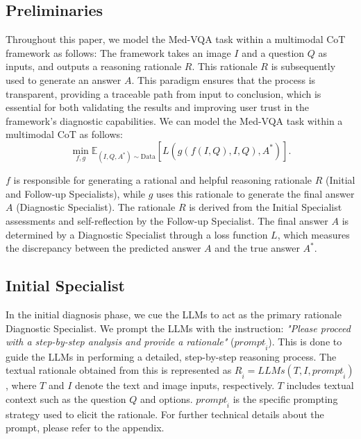 \documentclass[11pt]{article}
\begin{document}
\subsection{Preliminaries}
Throughout this paper, we model the Med-VQA task within a multimodal CoT framework as follows: The framework takes an image \( I \) and a question \( Q \) as inputs, and outputs a reasoning rationale \( R \). This rationale \( R \) is subsequently used to generate an answer \( A \). This paradigm ensures that the process is transparent, providing a traceable path from input to conclusion, which is essential for both validating the results and improving user trust in the framework's diagnostic capabilities. We can model the Med-VQA task within a multimodal CoT as follows:
\begin{equation}
    \min_{f, g} \mathbb{E}_{(I, Q, A^*) \sim \text{Data}} \left[ L \left( g \left( f(I, Q), I, Q \right), A^* \right) \right].
\end{equation}

\( f \) is responsible for generating a rational and helpful reasoning rationale \( R \) (Initial and Follow-up Specialists), while \( g \) uses this rationale to generate the final answer \( A \) (Diagnostic Specialist). The rationale \( R \) is derived from the Initial Specialist assessments and self-reflection by the Follow-up Specialist. The final answer \( A \) is determined by a Diagnostic Specialist through a loss function \( L \), which measures the discrepancy between the predicted answer \( A \) and the true answer \( A^* \).



\subsection{Initial Specialist}
In the initial diagnosis phase, we cue the LLMs to act as the primary rationale Diagnostic Specialist. 
We prompt the LLMs with the instruction: 
\textit{"Please proceed with a step-by-step analysis and provide a rationale"} ($prompt_{\hat{i}}$).
This is done to guide the LLMs in performing a detailed, step-by-step reasoning process. 
The textual rationale obtained from this is represented as \( R_{\hat{i}} = LLMs(T, I, prompt_{\hat{i}}) \), where \( T \) and \( I \) denote the text and image inputs, respectively. \( T \) includes textual context such as the question \( Q \) and options.
\( prompt_{\hat{i}} \) is the specific prompting strategy used to elicit the rationale. For further technical details about the prompt, please refer to the appendix.
\end{document}

